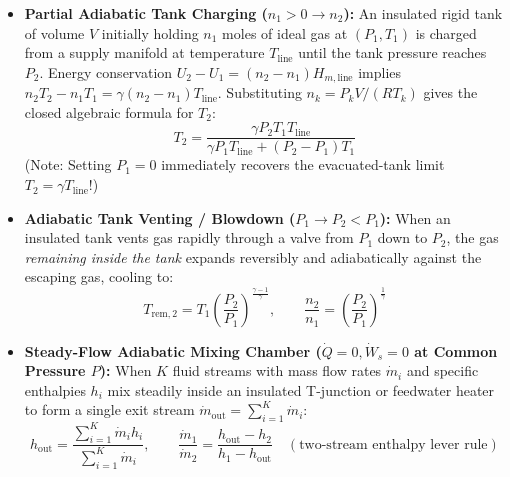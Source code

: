 \begin{formulacard}
\begin{itemize}
  \item \textbf{Partial Adiabatic Tank Charging ($n_1 > 0 \to n_2$):}
  An insulated rigid tank of volume $V$ initially holding $n_1$ moles of ideal gas at $(P_1, T_1)$ is charged from a supply manifold at temperature $T_{\mathrm{line}}$ until the tank pressure reaches $P_2$. Energy conservation $U_2 - U_1 = (n_2 - n_1)H_{m,\mathrm{line}}$ implies $n_2 T_2 - n_1 T_1 = \gamma(n_2 - n_1)T_{\mathrm{line}}$. Substituting $n_k = P_k V/(R T_k)$ gives the closed algebraic formula for $T_2$:
  \begin{equation}\label{eq:07:partial-tank-charge}
    \boxed{T_2 = \frac{\gamma P_2 T_1 T_{\mathrm{line}}}{\gamma P_1 T_{\mathrm{line}} + (P_2 - P_1)T_1}}
  \end{equation}
  (Note: Setting $P_1 = 0$ immediately recovers the evacuated-tank limit $T_2 = \gamma T_{\mathrm{line}}$!)
  \item \textbf{Adiabatic Tank Venting / Blowdown ($P_1 \to P_2 < P_1$):}
  When an insulated tank vents gas rapidly through a valve from $P_1$ down to $P_2$, the gas \emph{remaining inside the tank} expands reversibly and adiabatically against the escaping gas, cooling to:
  \begin{equation}\label{eq:07:tank-blowdown}
    \boxed{T_{\mathrm{rem},2} = T_1\left(\frac{P_2}{P_1}\right)^{\frac{\gamma - 1}{\gamma}}}, \qquad \frac{n_2}{n_1} = \left(\frac{P_2}{P_1}\right)^{\frac{1}{\gamma}}
  \end{equation}
  \item \textbf{Steady-Flow Adiabatic Mixing Chamber ($\dot{Q}=0, \dot{W}_s=0$ at Common Pressure $P$):}
  When $K$ fluid streams with mass flow rates $\dot{m}_i$ and specific enthalpies $h_i$ mix steadily inside an insulated T-junction or feedwater heater to form a single exit stream $\dot{m}_{\mathrm{out}} = \sum_{i=1}^K \dot{m}_i$:
  \begin{equation}\label{eq:07:mixing-chamber}
    \boxed{h_{\mathrm{out}} = \frac{\sum_{i=1}^K \dot{m}_i h_i}{\sum_{i=1}^K \dot{m}_i}}, \qquad \frac{\dot{m}_1}{\dot{m}_2} = \frac{h_{\mathrm{out}} - h_2}{h_1 - h_{\mathrm{out}}} \quad (\text{two-stream enthalpy lever rule})
  \end{equation}
\end{itemize}
\end{formulacard}

